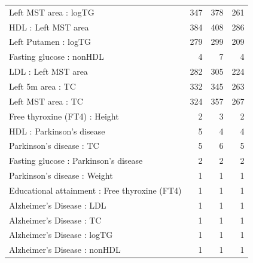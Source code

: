\begin{table}[ht]
\begin{tabular}{lrrr}
  Left MST area : logTG & 347 & 378 & 261 \\ 
  HDL : Left MST area & 384 & 408 & 286 \\ 
  Left Putamen : logTG & 279 & 299 & 209 \\ 
  Fasting glucose : nonHDL &   4 &   7 &   4 \\ 
  LDL : Left MST area & 282 & 305 & 224 \\ 
  Left 5m area : TC & 332 & 345 & 263 \\ 
  Left MST area : TC & 324 & 357 & 267 \\ 
  Free thyroxine (FT4) : Height  &   2 &   3 &   2 \\ 
  HDL : Parkinson's disease &   5 &   4 &   4 \\ 
  Parkinson's disease : TC &   5 &   6 &   5 \\ 
  Fasting glucose : Parkinson's disease &   2 &   2 &   2 \\ 
  Parkinson's disease : Weight  &   1 &   1 &   1 \\ 
  Educational attainment : Free thyroxine (FT4) &   1 &   1 &   1 \\ 
  Alzheimer's Disease : LDL &   1 &   1 &   1 \\ 
  Alzheimer's Disease : TC &   1 &   1 &   1 \\ 
  Alzheimer's Disease : logTG &   1 &   1 &   1 \\ 
  Alzheimer's Disease : nonHDL &   1 &   1 &   1 \\ 
   \hline
\end{tabular}
\end{table}

